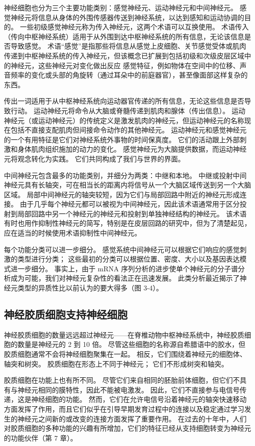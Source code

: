 神经细胞也分为三个主要功能类别：感觉神经元、运动神经元和中间神经元。 
感觉神经元将信息从身体的外围传感器传送到神经系统，以达到感知和运动协调的目的。 
一些初级感觉神经元称为传入神经元，这两个术语可以互换使用。 
术语传入（传向中枢神经系统）适用于从外围到达中枢神经系统的所有信息，无论该信息是否导致感觉。 
术语“感觉”是指那些将信息从感觉上皮细胞、关节感觉受体或肌肉传递到中枢神经系统的传入神经元，但该概念已扩展到包括初级和次级皮层区域中的神经元，这些神经元对变化做出反应 感觉特征，例如物体在空间中的位移、声音频率的变化或头部的角旋转（通过耳朵中的前庭器官），甚至像面部这样复杂的东西。


传出一词适用于从中枢神经系统向运动器官传递的所有信息，无论这些信息是否导致行动。 
运动神经元将命令从大脑或脊髓传递到肌肉和腺体（传出信息）。 
运动神经元（或运动神经元）的传统定义是激发肌肉的神经元，但运动神经元的名称现在包括不直接支配肌肉但间接命令动作的其他神经元。 
运动神经元和感觉神经元的一个有用特征是它们对神经系统外事物的时间保真度。 
它们的活动跟上外部刺激和身体肌肉组织施加的动力的变化。 
感觉神经元为大脑提供数据，而运动神经元将观念转化为实践。 
它们共同构成了我们与世界的界面。


中间神经元包含最多的功能类别，并细分为两类：中继和本地。 
中继或投射中间神经元具有长轴突，可在相当长的距离内将信号从一个大脑区域传送到另一个大脑区域。 
局部中间神经元的轴突较短，因为它们与局部回路中附近的神经元形成连接。 
由于几乎每个神经元都可以被视为中间神经元，因此该术语通常用于区分投射到局部回路中另一个神经元的神经元和投射到单独神经结构的神经元。 
该术语有时也用作抑制性神经元的简写，特别是在皮层回路的研究中，但为了清楚起见，应在适当的时候使用术语抑制性中间神经元。


每个功能分类可以进一步细分。 
感觉系统中间神经元可以根据它们响应的感觉刺激的类型进行分类； 
这些最初的分类可以根据位置、密度、大小以及基因表达模式进一步细分。 
事实上，由于 mRNA 序列分析的进步使单个神经元的分子谱分析成为可能，我们对神经元复杂性的看法正在迅速发展。 
此类分析最近揭示了神经元类型的异质性比以前认为的要大得多（图 3-4）。


\subsection{神经胶质细胞支持神经细胞}
神经胶质细胞的数量远远超过神经元——在脊椎动物中枢神经系统中，神经胶质细胞的数量是神经元的 2 到 10 倍。 
尽管这些细胞的名称源自希腊语中的胶水，但胶质细胞通常不会将神经细胞聚集在一起。 
相反，它们围绕着神经元的细胞体、轴突和树突。 
胶质细胞在形态上不同于神经元； 它们不形成树突和轴突。


胶质细胞在功能上也有所不同。 
尽管它们来自相同的胚胎前体细胞，但它们不具有与神经元相同的膜特性，因此不能被电激发。 
因此，它们不直接参与电信号传递，这是神经细胞的功能。 
然而，它们在允许电信号沿着神经元的轴突快速移动方面发挥了作用，而且它们似乎在引导早期发育过程中的连接以及稳定通过学习发生的神经元之间新的或改变的连接方面发挥了重要作用。 
在过去的十年中，人们对胶质细胞的多种功能的兴趣有所增加，它们的特征已经从支持细胞转变为神经元的功能伙伴（第 7 章）。


